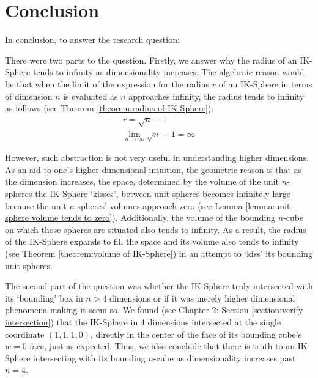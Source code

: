 \section{Conclusion}
In conclusion, to answer the research question:
\researchquestion{}

There were two parts to the question. Firstly, we answer why the radius of an IK-Sphere tends to infinity as dimensionality increases:
The algebraic reason would be that when the limit of the expression for the radius $r$ of an IK-Sphere in terms of dimension $n$ is evaluated as $n$ approaches infinity, the radius tends to infinity as follows (see Theorem \ref{theorem:radius of IK-Sphere}):
\begin{align*}
    r = \sqrt{n}-1\\
    \lim_{n \to \infty}\sqrt{n}-1 = \infty
\end{align*}

However, such abstraction is not very useful in understanding higher dimensions. As an aid to one's higher dimensional intuition, the geometric reason is that as the dimension increases, the space, determined by the volume of the unit $n$-spheres the IK-Sphere `kisses', between unit spheres becomes infinitely large because the unit $n$-spheres' volumes approach zero (see Lemma \ref{lemma:unit sphere volume tends to zero}). Additionally, the volume of the bounding $n$-cube on which those spheres are situated also tends to infinity. As a result, the radius of the IK-Sphere expands to fill the space and its volume also tends to infinity (see Theorem \ref{theorem:volume of IK-Sphere}) in an attempt to `kiss' its bounding unit spheres. 

The second part of the question was whether the IK-Sphere truly intersected with its `bounding' box in $n>4$ dimensions or if it was merely higher dimensional phenomena making it seem so. We found (see Chapter 2: Section \ref{section:verify intersection}) that the IK-Sphere in 4 dimensions intersected at the single coordinate $(1, 1, 1, 0)$, directly in the center of the face of its bounding cube's $w=0$ face, just as expected. Thus, we also conclude that there is truth to an IK-Sphere intersecting with its bounding $n$-cube as dimensionality increases past $n=4$.

